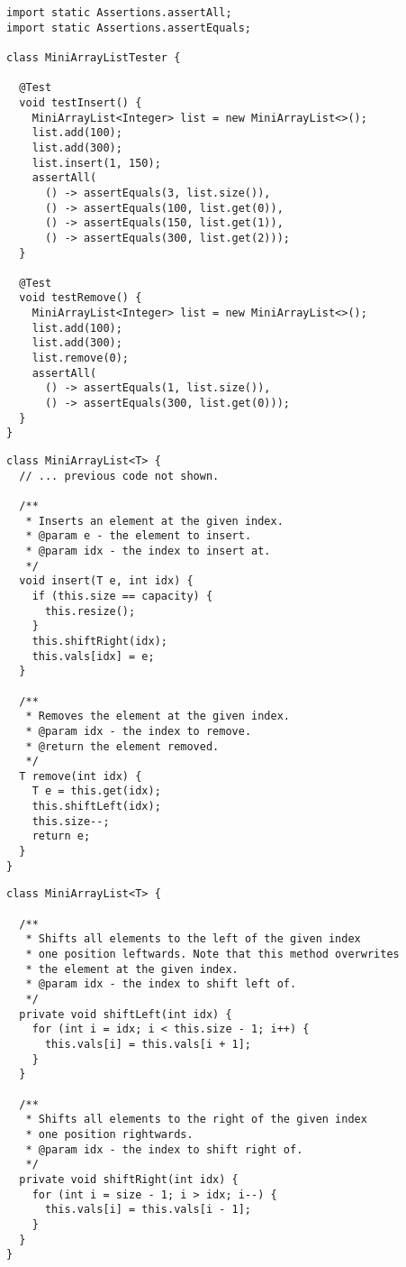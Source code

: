 \begin{lstlisting}[language=MyJava]
import static Assertions.assertAll;
import static Assertions.assertEquals;

class MiniArrayListTester {

  @Test
  void testInsert() {
    MiniArrayList<Integer> list = new MiniArrayList<>();
    list.add(100);
    list.add(300);
    list.insert(1, 150);
    assertAll(
      () -> assertEquals(3, list.size()),
      () -> assertEquals(100, list.get(0)),
      () -> assertEquals(150, list.get(1)),
      () -> assertEquals(300, list.get(2)));
  }

  @Test
  void testRemove() {
    MiniArrayList<Integer> list = new MiniArrayList<>();
    list.add(100);
    list.add(300);
    list.remove(0);
    assertAll(
      () -> assertEquals(1, list.size()),
      () -> assertEquals(300, list.get(0)));
  }
}
\end{lstlisting}

\begin{lstlisting}[language=MyJava]
class MiniArrayList<T> {
  // ... previous code not shown.

  /**
   * Inserts an element at the given index.
   * @param e - the element to insert.
   * @param idx - the index to insert at.
   */
  void insert(T e, int idx) {
    if (this.size == capacity) { 
      this.resize(); 
    }
    this.shiftRight(idx);
    this.vals[idx] = e;
  }

  /**
   * Removes the element at the given index.
   * @param idx - the index to remove.
   * @return the element removed.
   */
  T remove(int idx) {
    T e = this.get(idx);
    this.shiftLeft(idx);
    this.size--;
    return e;
  }
}
\end{lstlisting}

\begin{lstlisting}[language=MyJava]
class MiniArrayList<T> {

  /**
   * Shifts all elements to the left of the given index 
   * one position leftwards. Note that this method overwrites 
   * the element at the given index.
   * @param idx - the index to shift left of.
   */
  private void shiftLeft(int idx) {
    for (int i = idx; i < this.size - 1; i++) { 
      this.vals[i] = this.vals[i + 1]; 
    }
  }

  /**
   * Shifts all elements to the right of the given index 
   * one position rightwards.
   * @param idx - the index to shift right of.
   */
  private void shiftRight(int idx) {
    for (int i = size - 1; i > idx; i--) { 
      this.vals[i] = this.vals[i - 1]; 
    }
  }
}
\end{lstlisting}

